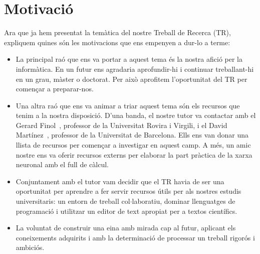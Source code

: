 \section{Motivació}
\vspace{-0.3truecm}
Ara que ja hem presentat la temàtica del nostre Treball de Recerca (TR), expliquem quines són les motivacions que ens empenyen a dur-lo a terme:
\vspace{-0.1truecm}
\begin{itemize}
\item La principal raó que ens va portar a aquest tema és la nostra afició per la informàtica. En un futur ens agradaria aprofundir-hi i continuar treballant-hi en un grau, màster o doctorat. Per això aprofitem l’oportunitat del TR per començar a preparar-nos.

\item Una altra raó que ens va animar a triar aquest tema són els recursos que tenim a la nostra disposició. D'una banda, el nostre tutor va contactar amb el Gerard Finol~\cite{gerard}, professor de la Universitat Rovira i Virgili, i el David Martínez~\cite{david}, professor de la Universitat de Barcelona. Ells ens van donar una llista de recursos per començar a investigar en aquest camp. A més, un amic nostre ens va oferir recursos externs per elaborar la part pràctica de la xarxa neuronal amb el full de càlcul.

\item Conjuntament amb el tutor vam decidir que el TR havia de ser una oportunitat per aprendre a fer servir recursos útils per als nostres estudis universitaris: un entorn de treball col$\cdot$laboratiu, dominar llenguatges de programació i utilitzar un editor de text apropiat per a textos científics.

\item La voluntat de construir una eina amb mirada cap al futur, aplicant els coneixements adquirits i amb la determinació de processar un treball rigorós i ambiciós.
\end{itemize}
\vspace{-0.6truecm}
